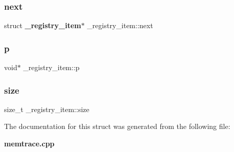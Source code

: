 \mbox{\label{struct__registry__item_aa659ff3f2fa74b37e31b0bd3948bbf7f}} 
\subsubsection{next}
{\footnotesize\ttfamily struct \textbf{ \+\_\+registry\+\_\+item}$\ast$ \+\_\+registry\+\_\+item\+::next}

\mbox{\label{struct__registry__item_a7d2b50523d8801a40d30e17bfab37149}} 
\subsubsection{p}
{\footnotesize\ttfamily void$\ast$ \+\_\+registry\+\_\+item\+::p}

\mbox{\label{struct__registry__item_a98122f145c9d8ef6b8e34c534307423d}} 
\subsubsection{size}
{\footnotesize\ttfamily size\+\_\+t \+\_\+registry\+\_\+item\+::size}



The documentation for this struct was generated from the following file\+:\begin{DoxyCompactItemize}
\item 
\textbf{ memtrace.\+cpp}\end{DoxyCompactItemize}
